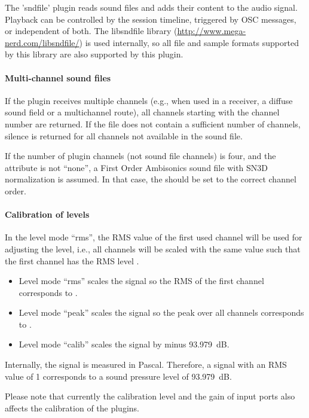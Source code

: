 The 'sndfile' plugin reads sound files and adds their content to the audio signal. Playback can be controlled by the session timeline, triggered by OSC messages, or independent of both. The libsndfile library (\url{http://www.mega-nerd.com/libsndfile/}) is used internally, so all file and sample formats supported by this library are also supported by this plugin.



\paragraph{Multi-channel sound files}
%
If the plugin receives multiple channels (e.g., when used in a receiver, a diffuse sound field or a multichannel route), all channels starting with the channel number  are returned. If the file does not contain a sufficient number of channels, silence is returned for all channels not available in the sound file.

If the number of plugin channels (not sound file channels) is four, and the attribute  is not ``none'', a First Order Ambisonics sound file with SN3D normalization is assumed. In that case, the  should be set to the correct channel order.

\paragraph{Calibration of levels}
%
In the level mode ``rms'', the RMS value of the first used channel
will be used for adjusting the level, i.e., all channels will be
scaled with the same value such that the first channel has the
RMS level .
\begin{itemize}
\item Level mode ``rms'' scales the signal so the RMS of the first channel corresponds to .

\item Level mode ``peak'' scales the signal so the peak over all channels corresponds to .

\item Level mode ``calib'' scales the signal by  minus 93.979~dB.
\end{itemize}
Internally, the signal is measured in Pascal. Therefore, a signal with an RMS value of 1 corresponds to a sound pressure level of 93.979~dB.

Please note that currently the calibration level and the gain of input ports also affects the calibration of the plugins.

